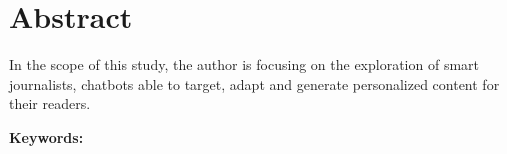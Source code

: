 \chapter*{Abstract}

In the scope of this study, the author is focusing on the exploration of smart journalists, chatbots able to target, adapt and generate personalized content for their readers.

\vskip0.5cm
\textbf{Keywords:} 
\Keywords
